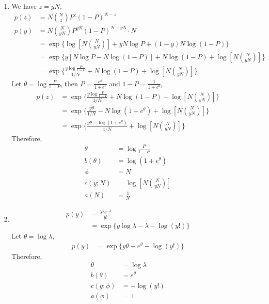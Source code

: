 \documentclass[11pt]{article}
\begin{document}
\begin{enumerate}[(A)]
\begin{enumerate}
    \item 
    We have $z = yN$,
    \begin{align*}
        p(z) &= N {N \choose z} P^z (1-P)^{N-z} \\
        p(y) &= N {N \choose yN} P^{yN} (1-P)^{N-yN} \cdot N \\
        &= \exp\{ \log\left[N{N \choose yN}\right] + yN \log P + (1-y)N\log (1-P) \} \\
        &= \exp \{y[N\log P - N \log (1-P)] + N \log (1-P) + \log\left[N{N \choose yN}\right]\} \\
        &= \exp \{\frac{y \log \frac{P}{1-P}}{1/N} + N \log (1-P) + \log\left[N{N \choose yN}\right]\}
    \end{align*}
    Let $\theta = \log \frac{P}{1-P}$, then $P = \frac{e^\theta}{1+e^\theta}$ and $1-P = \frac{1}{1+e^\theta}$,
    \begin{align*}
        p(z) &= \exp \{\frac{y \log \frac{P}{1-P}}{1/N} + N \log (1-P) + \log\left[N{N \choose yN}\right]\} \\
        &= \exp \{\frac{y \theta}{1/N} - N \log (1+e^\theta) + \log\left[N{N \choose yN}\right]\} \\
        &= \exp \{\frac{y \theta - \log (1+e^\theta)}{1/N} + \log\left[N{N \choose yN}\right]\}
    \end{align*}
    Therefore,
    \begin{align*}
    \theta &= \log \frac{P}{1-P} \\
    b(\theta) &= \log (1+e^\theta) \\
    \phi &= N \\
    c(y;N) &= \log\left[N{N \choose yN}\right] \\
    a(N) &= \frac{1}{N}
    \end{align*}
    
    \item 
    \begin{align*}
        p(y) &= \frac{\lambda^y e^{-\lambda}}{y!} \\
        &= \exp \{ y\log \lambda - \lambda -\log(y!) \}
    \end{align*}
    Let $\theta = \log \lambda$,
    \begin{align*}
        p(y) &= \exp \{ y\theta - e^\theta - \log(y!)\}
    \end{align*}
    Therefore,
    \begin{align*}
    \theta &= \log  \lambda \\
    b(\theta) &= e^\theta \\
    c(y;\phi) &= - \log(y!) \\
    a(\phi) &= 1
    \end{align*}
    

\end{enumerate}
\end{enumerate}
\end{document}
